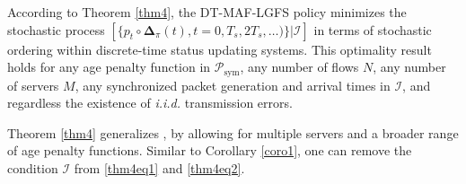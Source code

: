 According to  Theorem \ref{thm4}, the DT-MAF-LGFS policy minimizes the stochastic process $[\{p_t \circ\bm{\Delta}_\pi(t), t=0,T_s,2T_s,\ldots)\}|\mathcal{I}]$ in terms of stochastic ordering within discrete-time status updating systems. This optimality result holds for any age penalty function in $\mathcal{P}_{\text{sym}}$, any number of flows $N$, any number of servers $M$, any synchronized packet generation and arrival times in $\mathcal{I}$, and regardless the existence of \emph{i.i.d.} transmission errors. 

Theorem \ref{thm4} generalizes \cite[Theorem 1]{IgorAllerton2016}, %
by allowing for multiple servers and a broader range of age penalty functions.
Similar to Corollary \ref{coro1}, one can remove the condition $\mathcal{I}$ from \eqref{thm4eq1} and \eqref{thm4eq2}.





